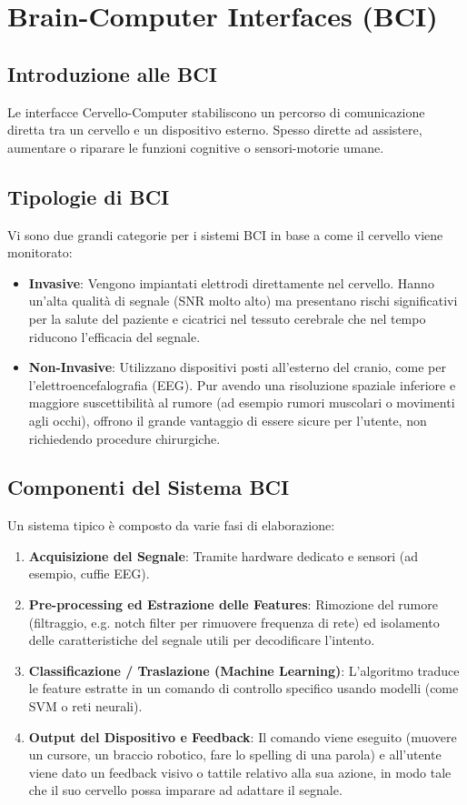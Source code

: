 \chapter{Brain-Computer Interfaces (BCI)}

\section{Introduzione alle BCI}
Le interfacce Cervello-Computer stabiliscono un percorso di comunicazione diretta tra un cervello e un dispositivo esterno. Spesso dirette ad assistere, aumentare o riparare le funzioni cognitive o sensori-motorie umane.

\section{Tipologie di BCI}
Vi sono due grandi categorie per i sistemi BCI in base a come il cervello viene monitorato:
\begin{itemize}
    \item \textbf{Invasive}: Vengono impiantati elettrodi direttamente nel cervello. Hanno un'alta qualità di segnale (SNR molto alto) ma presentano rischi significativi per la salute del paziente e cicatrici nel tessuto cerebrale che nel tempo riducono l'efficacia del segnale.
    \item \textbf{Non-Invasive}: Utilizzano dispositivi posti all'esterno del cranio, come per l'elettroencefalografia (EEG). Pur avendo una risoluzione spaziale inferiore e maggiore suscettibilità al rumore (ad esempio rumori muscolari o movimenti agli occhi), offrono il grande vantaggio di essere sicure per l'utente, non richiedendo procedure chirurgiche.
\end{itemize}

\section{Componenti del Sistema BCI}
Un sistema tipico è composto da varie fasi di elaborazione:
\begin{enumerate}
    \item \textbf{Acquisizione del Segnale}: Tramite hardware dedicato e sensori (ad esempio, cuffie EEG).
    \item \textbf{Pre-processing ed Estrazione delle Features}: Rimozione del rumore (filtraggio, e.g. notch filter per rimuovere frequenza di rete) ed isolamento delle caratteristiche del segnale utili per decodificare l'intento.
    \item \textbf{Classificazione / Traslazione (Machine Learning)}: L'algoritmo traduce le feature estratte in un comando di controllo specifico usando modelli (come SVM o reti neurali).
    \item \textbf{Output del Dispositivo e Feedback}: Il comando viene eseguito (muovere un cursore, un braccio robotico, fare lo spelling di una parola) e all'utente viene dato un feedback visivo o tattile relativo alla sua azione, in modo tale che il suo cervello possa imparare ad adattare il segnale.
\end{enumerate}

